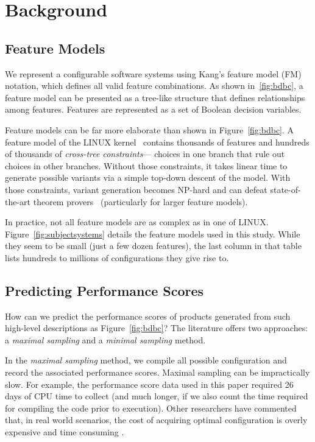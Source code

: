 \documentclass{sig-alternative}
\newcommand{\fig}[1]{Figure~\ref{fig:#1}}
\begin{document}
\section{Background}  

\subsection{Feature Models}
We represent a configurable software systems using Kang's feature model (FM) notation, which defines all valid feature combinations. 
As shown in~\ref{fig:bdbc}, a feature model can be presented as a tree-like structure that defines relationships among features.   Features are represented as a set of Boolean decision variables. 

Feature models can be far more elaborate than shown in \fig{bdbc}. 
A feature model of the LINUX kernel~\cite{sayyad13b} contains thousands of features and hundreds of thousands of  {\em cross-tree constraints}--- choices in one branch that rule out choices in other branches. 
Without those constraints, it takes linear time to generate possible variants via a simple
top-down descent of the model. With those constraints, variant generation becomes NP-hard and can
 defeat state-of-the-art theorem provers~\cite{pohl11} (particularly for larger feature models).
 
 
 
In practice, not all feature models are as complex as in one of LINUX.
\fig{subjectsystems} details the feature models used in this study. While
they seem to be small (just a few dozen features), the last column in that table lists hundreds
to millions of configurations they give rise to.


\subsection{Predicting Performance Scores}\label{sect:addit}
How can we predict the performance scores of products generated from such high-level descriptions
as \fig{bdbc}? The literature offers two approaches: a {\em maximal sampling} and a {\em minimal sampling} method.

In the {\em maximal sampling} method, we compile all  possible configuration and record the associated performance scores. Maximal sampling  can be impractically slow.
For example, the performance score data used in this paper required  26 days of CPU time to collect (and much longer, if we also count the time required
 for compiling the code prior to execution). 
 Other researchers have commented that,  in 
 real world scenarios, the cost of acquiring optimal configuration is overly expensive and time consuming \cite{weiss2008maximizing}.
 
\end{document}
